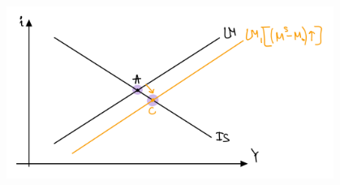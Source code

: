 \documentclass[usenames,dvipsnames]{beamer}
\begin{document}
\begin{RTL}
\begin{frame}[allowframebreaks]
            \begin{figure}[H]
                \begin{small}
                    \begin{center}
                        \includegraphics[width=0.95\textwidth]{figures/ISLM LM Move.png}
                    \end{center}
                    \label{fig:}
                \end{small}
            \end{figure}
        
        \end{frame}
\end{RTL}
\end{document}
